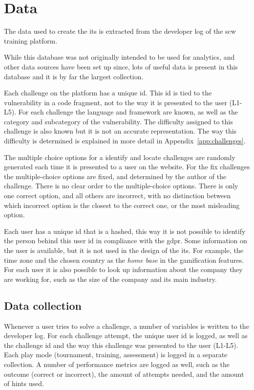 \section{Data}
\label{sec:data}

The data used to create the \gls{its} is extracted from the developer log of the \gls{scw} training platform.

While this database was not originally intended to be used for analytics, and other data sources have been set up since, lots of useful data is present in this database and it is by far the largest collection. 

Each challenge on the platform has a unique \gls{id}.
This \gls{id} is tied to the \gls{vulnerability} in a code fragment, not to the way it is presented to the user (L1-L5).
For each challenge the language and framework are known, as well as the category and subcategory of the vulnerability.
The difficulty assigned to this challenge is also known but it is not an accurate representation.
The way this difficulty is determined is explained in more detail in Appendix~\ref{app:challenges}.

The multiple choice options for a identify and locate challenges are randomly generated each time it is presented to a user on the website.
For the fix challenges the multiple-choice options are fixed, and determined by the author of the challenge.
There is no clear order to the multiple-choice options.
There is only one correct option, and all others are incorrect, with no distinction between which incorrect option is the closest to the correct one, or the most misleading option.

Each user has a unique \gls{id} that is a hashed, this way it is not possible to identify the person behind this user \gls{id} in compliance with the \gls{gdpr}.
Some information on the user is available, but it is not used in the design of the \gls{its}.
For example, the time zone and the chosen country as the \textit{home base} in the gamification features.
For each user it is also possible to look up information about the company they are working for, such as the size of the company and its main industry.

\subsection{Data collection}
Whenever a user tries to solve a challenge, a number of variables is written to the developer log.
For each challenge attempt, the unique user \gls{id} is logged, as well as the challenge \gls{id} and the way this challenge was presented to the user (L1-L5).
Each play mode (tournament, training, assessment) is logged in a separate collection.
A number of performance metrics are logged as well, such as the outcome (correct or incorrect), the amount of attempts needed, and the amount of hints used.

